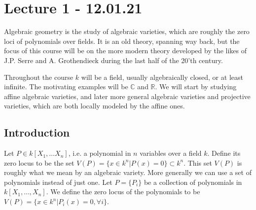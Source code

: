\section{Lecture 1 - 12.01.21}





Algebraic geometry is the study of algebraic varieties, which are roughly the zero loci of polynomials over fields. It is an old theory, spanning way back, but the focus of this course will be on the more modern theory developed by the likes of J.P. Serre and A. Grothendieck during the last half of the 20'th century. 

Throughout the course $k$ will be a field, usually algebraically closed, or at least infinite. The motivating examples will be $\mathbb{C}$ and $\mathbb{R}$. We will start by studying affine algebraic varieties, and later more general algebraic varieties and projective varieties, which are both locally modeled by the affine ones. 


\subsection{Introduction}

Let $P\in k[X_1, \ldots X_n]$, i.e. a polynomial in $n$ variables over a field $k$. Define its zero locus to be the set $V(P) = \{ x\in k^n \vert P(x)=0 \}\subset k^n$. This set $V(P)$ is roughly what we mean by an algebraic variety. More generally we can use a set of polynomials instead of just one. Let $P=\{ P_i\}$ be a collection of polynomials in $k[X_1, \ldots, X_n]$. We define the zero locus of the polynomials to be $V(P) = \{ x\in k^n \vert P_i(x)=0, \forall i\}$. 

